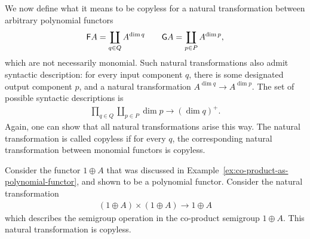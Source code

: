 We now define what it means to be copyless for a natural transformation between arbitrary polynomial functors 
\begin{align*}
\mathsf F A = \coprod_{q \in Q} A^{\dim q} \qquad 
\mathsf G A = \coprod_{p \in P} A^{\dim p},
\end{align*}
which are not necessarily monomial. Such natural transformations also admit syntactic description: for every input component $q$, there is some designated output component $p$, and a natural transformation $A^{\dim q} \to A^{\dim p}$.  The set of possible syntactic descriptions is
\begin{align*}
\prod_{q \in Q} \coprod_{p \in P} \dim p \to (\dim q)^+.
\end{align*}
Again, one can show that all natural transformations arise this way. The natural transformation is called copyless if for every $q$, the corresponding natural transformation between monomial functors is copyless. 


\begin{myexample}\label{ex:copyless-on-co-products}
    Consider the functor $1 \oplus A$ that was discussed in Example~\ref{ex:co-product-as-polynomial-functor}, and shown to be a polynomial functor. Consider the natural transformation 
    \begin{align*}
    (1 \oplus A)\times (1 \oplus A) \to 1 \oplus A
    \end{align*}
    which describes the semigroup operation in the co-product semigroup $1 \oplus A$. This natural transformation is copyless.
\end{myexample}


